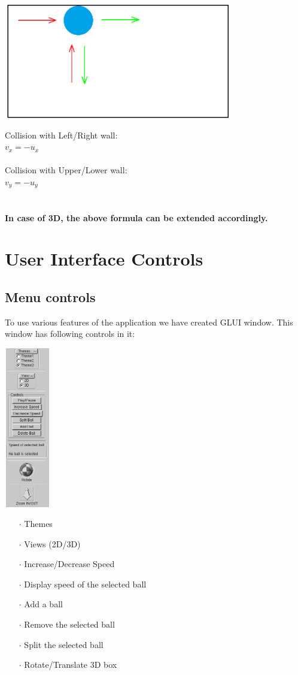 \documentclass[a4paper,12pt]{report}
\begin{document}
\begin{center}
\includegraphics[height=5cm,width=10cm]{WallCollision.png}\\
\end{center}
Collision with Left/Right wall:\\
$v_{x} = -u_{x}$\\\\
Collision with Upper/Lower wall:\\
$v_{y} = -u_{y}$
\\\\\\
\textbf{In case of 3D, the above formula can be extended accordingly.}

\chapter{User Interface Controls}

\section{Menu controls}
To use various features of the application we have created GLUI  window. This window has following controls in it:
\begin{center}
\includegraphics[height=7cm,width=2cm]{menu.png}\\
\end{center}
\begin{itemize}
\item[$\cdot$] Themes
\item[$\cdot$] Views (2D/3D)
\item[$\cdot$] Increase/Decrease Speed
\item[$\cdot$] Display speed of the selected ball
\item[$\cdot$] Add a ball
\item[$\cdot$] Remove the selected ball
\item[$\cdot$] Split the selected ball
\item[$\cdot$] Rotate/Translate 3D box
\end{itemize}
\end{document}
